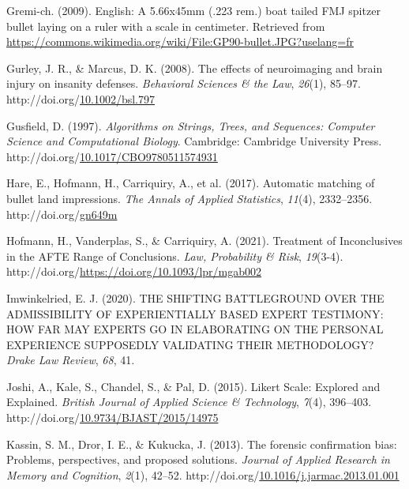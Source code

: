 \documentclass[print]{nuthesis}
\newlength{\cslhangindent}
\newenvironment{CSLReferences}[2]%
{\setlength{\parindent}{0pt}%
\everypar{\setlength{\hangindent}{\cslhangindent}}\ignorespaces}%
{\par}
\begin{document}
\begin{CSLReferences}{1}{0}
\leavevmode{}%
Gremi-ch. (2009). English: {A} 5.66x45mm (.223 rem.) boat tailed {FMJ} spitzer bullet laying on a ruler with a scale in centimeter. Retrieved from \url{https://commons.wikimedia.org/wiki/File:GP90-bullet.JPG?uselang=fr}

\leavevmode{}%
Gurley, J. R., \& Marcus, D. K. (2008). The effects of neuroimaging and brain injury on insanity defenses. \emph{Behavioral Sciences \& the Law}, \emph{26}(1), 85--97. http://doi.org/\href{https://doi.org/10.1002/bsl.797}{10.1002/bsl.797}

\leavevmode{}%
Gusfield, D. (1997). \emph{Algorithms on {Strings}, {Trees}, and {Sequences}: {Computer} {Science} and {Computational} {Biology}}. Cambridge: Cambridge University Press. http://doi.org/\href{https://doi.org/10.1017/CBO9780511574931}{10.1017/CBO9780511574931}

\leavevmode{}%
Hare, E., Hofmann, H., Carriquiry, A., et al. (2017). Automatic matching of bullet land impressions. \emph{The Annals of Applied Statistics}, \emph{11}(4), 2332--2356. http://doi.org/\href{https://doi.org/gn649m}{gn649m}

\leavevmode{}%
Hofmann, H., Vanderplas, S., \& Carriquiry, A. (2021). Treatment of {Inconclusives} in the {AFTE} {Range} of {Conclusions}. \emph{Law, Probability \& Risk}, \emph{19}(3-4). http://doi.org/\url{https://doi.org/10.1093/lpr/mgab002}

\leavevmode{}%
Imwinkelried, E. J. (2020). {THE} {SHIFTING} {BATTLEGROUND} {OVER} {THE} {ADMISSIBILITY} {OF} {EXPERIENTIALLY} {BASED} {EXPERT} {TESTIMONY}: {HOW} {FAR} {MAY} {EXPERTS} {GO} {IN} {ELABORATING} {ON} {THE} {PERSONAL} {EXPERIENCE} {SUPPOSEDLY} {VALIDATING} {THEIR} {METHODOLOGY}? \emph{Drake Law Review}, \emph{68}, 41.

\leavevmode{}%
Joshi, A., Kale, S., Chandel, S., \& Pal, D. (2015). Likert {Scale}: {Explored} and {Explained}. \emph{British Journal of Applied Science \& Technology}, \emph{7}(4), 396--403. http://doi.org/\href{https://doi.org/10.9734/BJAST/2015/14975}{10.9734/BJAST/2015/14975}

\leavevmode{}%
Kassin, S. M., Dror, I. E., \& Kukucka, J. (2013). The forensic confirmation bias: {Problems}, perspectives, and proposed solutions. \emph{Journal of Applied Research in Memory and Cognition}, \emph{2}(1), 42--52. http://doi.org/\href{https://doi.org/10.1016/j.jarmac.2013.01.001}{10.1016/j.jarmac.2013.01.001}


\end{CSLReferences}
\end{document}
